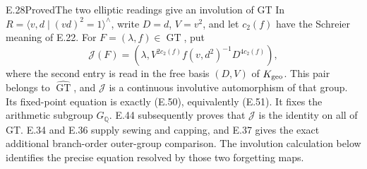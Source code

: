 \begin{result}{E.28}{Proved}{The two elliptic readings give an involution of GT}
In $R=\langle v,d\mid(vd)^2=1\rangle^{\wedge}$,
write $D=d$, $V=v^2$, and let $c_2(f)$ have the
Schreier meaning of E.22.  For
$F=(\lambda,f)\in\widehat{\operatorname{GT}}$, put
\[
 \mathcal J(F)=\left(\lambda,
       V^{2c_2(f)}f(v,d^2)^{-1}D^{4c_2(f)}\right),        \tag{E.72}
\]
where the second entry is read in the free basis
$(D,V)$ of $K_{\rm geo}$.
This pair belongs to $\widehat{\operatorname{GT}}$,
and $\mathcal J$ is a continuous involutive
automorphism of that group.  Its fixed-point
equation is exactly (E.50), equivalently (E.51).
It fixes the arithmetic subgroup $G_{\mathbb Q}$.
E.44 subsequently proves that $\mathcal J$ is the
identity on all of GT. E.34 and E.36 supply sewing
and capping, and E.37 gives the exact additional
branch-order outer-group comparison. The involution
calculation below identifies the precise equation
resolved by those two forgetting maps.
\end{result}
